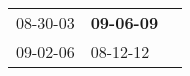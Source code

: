 \begin{supertabular}{p{0.33\columnwidth}p{0.33\columnwidth}p{0.33\columnwidth}}
 08-30-03\textsuperscript{} &  \textbf{09-06-09\textsuperscript{}} \\
 09-02-06\textsuperscript{} &           08-12-12\textsuperscript{} \\
\end{supertabular}
